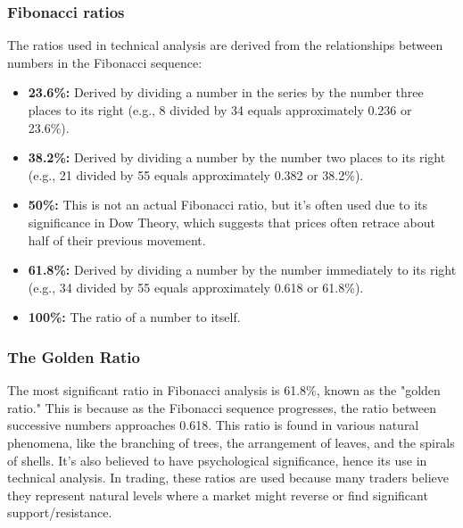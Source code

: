\documentclass{report}
\begin{document}
        \bigbreak \noindent 
        \subsubsection{Fibonacci ratios}
        \bigbreak \noindent 
        The ratios used in technical analysis are derived from the relationships between numbers in the Fibonacci sequence:
        \begin{itemize}
            \item \textbf{23.6\%:} Derived by dividing a number in the series by the number three places to its right (e.g., 8 divided by 34 equals approximately 0.236 or 23.6\%).
            \item \textbf{38.2\%:} Derived by dividing a number by the number two places to its right (e.g., 21 divided by 55 equals approximately 0.382 or 38.2\%).
            \item \textbf{50\%:} This is not an actual Fibonacci ratio, but it's often used due to its significance in Dow Theory, which suggests that prices often retrace about half of their previous movement.
            \item \textbf{61.8\%:} Derived by dividing a number by the number immediately to its right (e.g., 34 divided by 55 equals approximately 0.618 or 61.8\%).
            \item \textbf{100\%:} The ratio of a number to itself.
        \end{itemize}
        \bigbreak \noindent 
        \subsubsection{The Golden Ratio}
        \bigbreak \noindent 
        The most significant ratio in Fibonacci analysis is 61.8\%, known as the "golden ratio." This is because as the Fibonacci sequence progresses, the ratio between successive numbers approaches 0.618. This ratio is found in various natural phenomena, like the branching of trees, the arrangement of leaves, and the spirals of shells. It's also believed to have psychological significance, hence its use in technical analysis.
        \bigbreak \noindent 
        In trading, these ratios are used because many traders believe they represent natural levels where a market might reverse or find significant support/resistance.

     \bigbreak \noindent 
\end{document}
